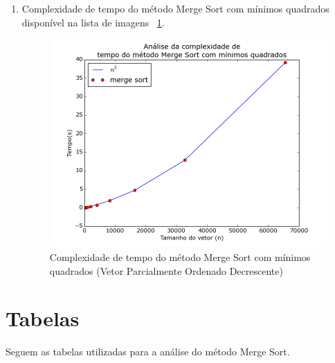\documentclass[12pt,a4paper,twoside]{report}
\begin{document}
\begin{enumerate}
\begin{enumerate}
											\item Complexidade de tempo do método Merge Sort com mínimos quadrados disponível na lista de imagens  ~\ref{fig:MergePlot3POD}.
											\begin{figure}[!h]
												\centering
												\includegraphics[scale=0.6]{../imagens/Merge/merge_plot_3_parcialmente_ordenado_decrescente.png}
												\caption{Complexidade de tempo do método Merge Sort com mínimos quadrados (Vetor Parcialmente Ordenado Decrescente) \label{fig:MergePlot3POD}}
											\end{figure}

										\end{enumerate}


\end{enumerate}

\chapter{Tabelas}

Seguem as tabelas utilizadas para a análise do método Merge Sort.
\end{document}
